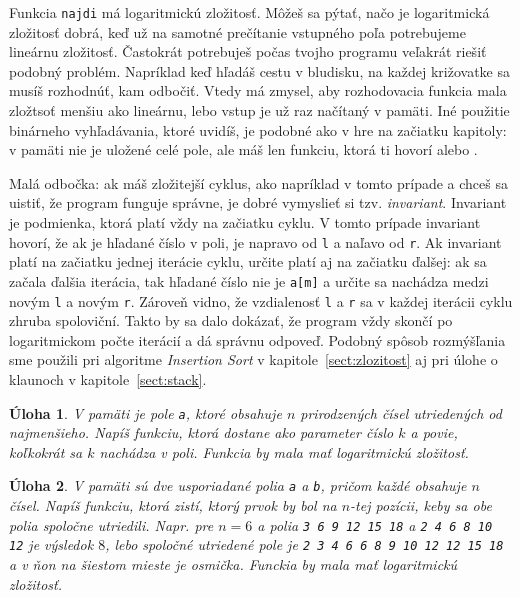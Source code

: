 \documentclass[10pt]{article}
\def\prg{\lstinline}
\def\ods{\vspace*{10pt}}
\newtheorem{uloha}{Úloha}
\begin{document}
\ods Funkcia {\tt najdi} má logaritmickú zložitosť. 
Môžeš sa pýtať, načo je logaritmická zložitosť
dobrá, keď už na samotné prečítanie vstupného poľa potrebujeme lineárnu zložitosť. 
Častokrát potrebuješ počas tvojho programu veľakrát riešiť podobný problém. Napríklad
keď hľadáš cestu v bludisku, na každej križovatke sa musíš rozhodnúť, kam odbočiť. Vtedy
má zmysel, aby rozhodovacia funkcia mala zložtsoť menšiu ako lineárnu, lebo 
vstup je už raz načítaný v pamäti. Iné použitie binárneho vyhľadávania, ktoré uvidíš,
je podobné ako v hre na začiatku kapitoly: v pamäti nie je uložené celé pole, ale 
máš len funkciu, ktorá ti hovorí  alebo .

\ods Malá odbočka: ak máš zložitejší cyklus, ako napríklad v tomto prípade a chceš 
sa uistiť, že program funguje správne, je dobré vymyslieť si tzv. {\em invariant}.
Invariant je podmienka, ktorá platí vždy na začiatku cyklu. V tomto prípade 
invariant hovorí, že ak je hľadané číslo v poli, je napravo od {\tt l} a naľavo od {\tt r}.
Ak invariant platí na začiatku jednej iterácie cyklu, určite platí aj na začiatku ďalšej:
ak sa začala ďalšia iterácia, tak hľadané číslo nie je \prg!a[m]! a určite 
sa nachádza medzi novým {\tt l} a novým {\tt r}. Zároveň vidno, že vzdialenosť {\tt l}
a {\tt r} sa v každej iterácii cyklu zhruba spoloviční. Takto by sa dalo dokázať,
že program vždy skončí po logaritmickom počte iterácií a dá správnu odpoveď.
Podobný spôsob rozmýšľania sme použili pri algoritme {\em Insertion Sort} v 
kapitole~\ref{sect:zlozitost} aj pri úlohe o klaunoch v kapitole~\ref{sect:stack}.

\begin{uloha}
  V pamäti je pole \prg!a!, ktoré obsahuje $n$ prirodzených čísel
  utriedených od najmenšieho. Napíš funkciu, ktorá dostane ako parameter 
  číslo $k$ a povie, koľkokrát sa $k$ nachádza v poli. Funkcia by mala
  mať logaritmickú zložitosť.
\end{uloha}

\begin{uloha}
  V pamäti sú dve usporiadané polia {\tt a} a {\tt b}, pričom každé obsahuje $n$ čísel.
  Napíš funkciu, ktorá zistí, ktorý prvok by bol na $n$-tej pozícii, keby sa obe
  polia spoločne utriedili. Napr. pre $n=6$ a polia {\tt 3 6 9 12 15 18} a 
  {\tt 2 4 6 8 10 12} je výsledok $8$, lebo spoločné utriedené pole
  je {\tt 2 3 4 6 6 8 9 10 12 12 15 18} a v ňon na šiestom mieste je osmička.
  Funckia by mala mať logaritmickú zložitosť.
\end{uloha}
\end{document}
